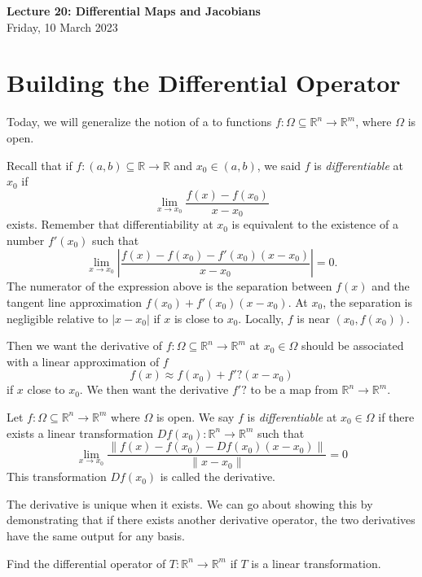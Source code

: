 \documentclass[11pt]{article}
\theoremstyle{definition}
\newcommand{\R}{\mathbb{R}}                      %
\begin{document}
\thispagestyle{empty}

\begin{center}
{\LARGE \bf Lecture 20: Differential Maps and Jacobians}\\
{\large Friday, 10 March 2023}\\
\end{center}

\section{Building the Differential Operator}
Today, we will generalize the notion of a  to functions $f:\Omega\subseteq \R^n\to\R^m$, where $\Omega$ is open.

Recall that if $f:(a,b)\subseteq \R\to \R$ and $x_0\in(a,b)$, we said $f$ is \textit{differentiable} at $x_0$ if 
$$
\lim_{x\to x_0} \frac{f(x)-f(x_0)}{x-x_0}
$$
exists. Remember that differentiability at $x_0$ is equivalent to the existence of a number $f'(x_0)$ such that
$$
\lim_{x\to x_0}\left|\frac{f(x)-f(x_0)-f'(x_0)(x-x_0)}{x-x_0} \right|=0.
$$
The numerator of the expression above is the separation between $f(x)$ and the tangent line approximation $f(x_0)+f'(x_0)(x-x_0)$. At $x_0$, the separation is negligible relative to $|x-x_0|$ if $x$ is close to $x_0$. Locally, $f$ is  near $(x_0,f(x_0))$.

Then we want the derivative of $f:\Omega \subseteq \R^n\to \R^m$ at $x_0\in \Omega$ should be associated with a  linear approximation of $f$
$$
f(x)\approx f(x_0)+f'? (x-x_0)
$$
if $x$ close to $x_0$. We then want the derivative $f'?$ to be a map from $\R^n\to \R^m$.

\begin{mdframed}[backgroundcolor = blue!10]
\vspace{+0.2cm}
 Let $f:\Omega\subseteq \R^n\to\R^m$ where $\Omega$ is open. We say $f$ is \textit{differentiable} at $x_0\in\Omega$ if there exists a linear transformation $Df(x_0):\R^n\to\R^m$ such that 
$$
\lim_{x\to x_0} \frac{\|f(x)-f(x_0)-Df(x_0)(x-x_0)\|}{\|x-x_0\|}=0
$$
This transformation $Df(x_0)$ is called the derivative.
\end{mdframed}
\note The derivative is unique when it exists. We can go about showing this by demonstrating that if there exists another derivative operator, the two derivatives have the same output for any basis.

\ex Find the differential operator of $T:\R^n\to \R^m$ if $T$ is a linear transformation.
\end{document}
